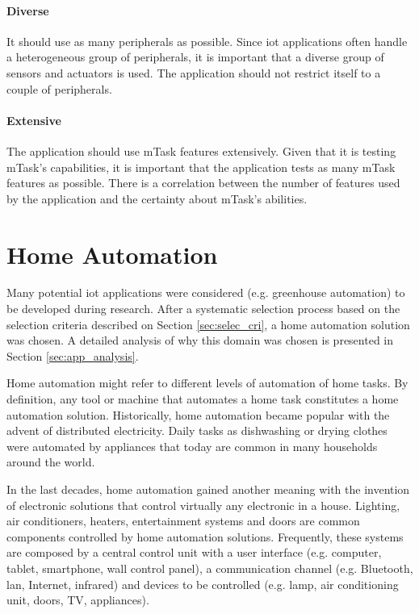 \paragraph{Diverse} It should use as many peripherals as possible. Since \gls{iot} applications often handle a heterogeneous group of peripherals, it is important that a diverse group of sensors and actuators is used. The application should not restrict itself to a couple of peripherals. 

\paragraph{Extensive} The application should use \gls{mTask} features extensively. Given that it is testing \gls{mTask}'s capabilities, it is important that the application tests as many \gls{mTask} features as possible. There is a correlation between the number of features used by the application and the certainty about \gls{mTask}'s abilities.

\section{Home Automation}

Many potential \ac{iot} applications were considered (e.g. greenhouse automation) to be developed during research. After a systematic selection process based on the selection criteria described on Section \ref{sec:selec_cri}, a home automation solution was chosen. A detailed analysis of why this domain was chosen is presented in Section \ref{sec:app_analysis}.

Home automation might refer to different levels of automation of home tasks. By definition, any tool or machine that automates a home task constitutes a home automation solution. Historically, home automation became popular with the advent of distributed electricity. Daily tasks as dishwashing or drying clothes were automated by appliances that today are common in many households around the world.

In the last decades, home automation gained another meaning with the invention of electronic solutions that control virtually any electronic in a house. Lighting, air conditioners, heaters, entertainment systems and doors are common components controlled by home automation solutions. Frequently, these systems are composed by a central control unit with a user interface (e.g. computer, tablet, smartphone, wall control panel), a communication channel (e.g. Bluetooth, \acs{lan}, Internet, infrared) and devices to be controlled (e.g. lamp, air conditioning unit, doors, TV, appliances).

